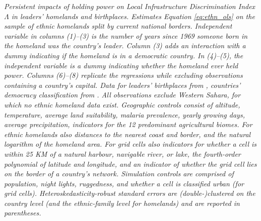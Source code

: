 \documentclass[11pt, oneside]{article}   	%
\newcommand{\mysubcaption}[1]{
\justify
\begin{spacing}{0.7}
\textit{\footnotesize #1}
\end{spacing}}
\begin{document}
\begin{table}[!t]
{}

\mysubcaption{Persistent impacts of holding power on Local Infrastructure Discrimination Index $\Lambda$ in leaders' homelands and birthplaces. Estimates Equation \eqref{eq:ethn_ols} on the sample of ethnic homelands split by current national borders. Independent variable in columns (1)--(3) is the number of years since 1969 someone born in the homeland was the country's leader. Column (3) adds an interaction with a dummy indicating if the homeland is in a democratic country. In (4)--(5), the independent variable is a dummy indicating whether the homeland ever held power. Columns (6)--(8) replicate the regressions while excluding observations containing a country's capital. Data for leaders' birthplaces from \cite{Dreher_AiddemandAfrican_2016}, countries' democracy classification from \cite{Marshall_PolityProjectCenter_2015}. All observations exclude Western Sahara, for which no ethnic homeland data exist. Geographic controls consist of altitude, temperature, average land suitability, malaria prevalence, yearly growing days, average precipitation, indicators for the 12 predominant agricultural biomes. For ethnic homelands also distances to the nearest coast and border, and the natural logarithm of the homeland area. For grid cells also indicators for whether a cell is within 25 KM of a natural harbour, navigable river, or lake, the fourth-order polynomial of latitude and longitude, and an indicator of whether the grid cell lies on the border of a country's network. Simulation controls are comprised of population, night lights, ruggedness, and whether a cell is classified urban (for grid cells). Heteroskedasticity-robust standard errors are (double-)clustered on the country level (and the ethnic-family level for homelands) and are reported in parentheses.}
\end{table}
\end{document}
